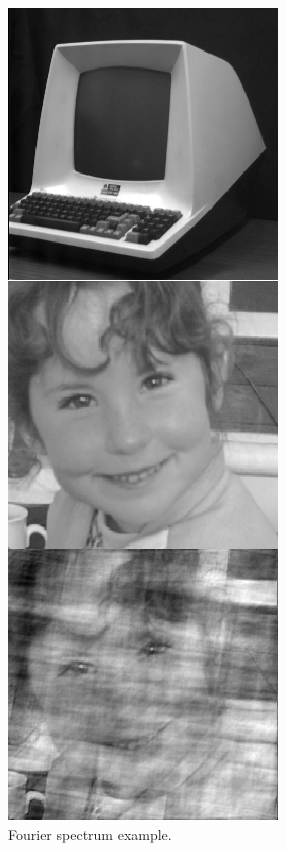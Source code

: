 \documentclass[12pt]{article}
\begin{document}
\begin{figure}[!htbp]
	\begin{center}
		\leavevmode
		\includegraphics[scale=1]{images/phase.png}
		\caption{Fourier spectrum example.}
		\label{fig:rasterData}
	\end{center}
\end{figure}



\end{document}
